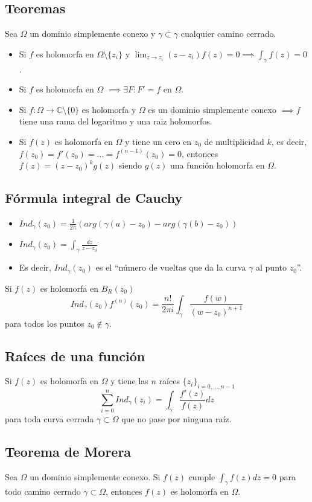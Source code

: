 \documentclass[paper=a4, fontsize=11pt]{scrartcl}
\numberwithin{equation}{section}
\numberwithin{figure}{section}
\numberwithin{table}{section}
\begin{document}
\subsection{Teoremas}
Sea $\Omega$ un dominio simplemente conexo y $\gamma\subset\gamma$ cualquier camino cerrado.
\begin{itemize}
\item Si $f$ es holomorfa en $\Omega\setminus\{z_i\}$ y $\lim_{z\to z_i} (z-z_i)f(z) = 0 \implies \int_{\gamma}f(z) = 0$.
\item Si $f$ es holomorfa en $\Omega$ $\implies \exists F: F'=f$ en $\Omega$.
\item Si $f:\Omega\to\mathbb{C}\setminus\{0\}$ es holomorfa y $\Omega$ es un dominio simplemente conexo $\implies f$ tiene una rama del logaritmo y una raiz holomorfos.
\item Si $f(z)$ es holomorfa en $\Omega$ y tiene un cero en $z_0$ de multiplicidad $k$, es decir, $f(z_0) = f'(z_0) = \hdots = f^{(n-1)}(z_0) = 0$, entonces $f(z) = (z-z_0)^kg(z)$ siendo $g(z)$ una función holomorfa en $\Omega$.
\end{itemize}

\subsection{Fórmula integral de Cauchy}
\begin{itemize}
\item $Ind_\gamma (z_0) = \frac{1}{2\pi}\left(arg(\gamma(a)-z_0)-arg(\gamma(b)-z_0)\right)$
\item $Ind_\gamma (z_0) = \int_\gamma \frac{dz}{z-z_0}$
\item Es decir, $Ind_\gamma (z_0)$ es el ``número de vueltas que da la curva $\gamma$ al punto $z_0$''.
\end{itemize}
Si $f(z)$ es holomorfa en $B_R(z_0)$
$$\boxed{Ind_\gamma(z_0) f^{(n)}(z_0) = \frac{n!}{2\pi i}\int_\gamma \frac{f(w)}{(w-z_0)^{n+1}}}$$
para todos los puntos $z_0\notin \gamma$.

\subsection{Raíces de una función}
Si $f(z)$ es holomorfa en $\Omega$ y tiene las $n$ raíces $\{{z_i}\}_{i=0,\hdots,n-1}$
$$\sum_{i=0}^n Ind_\gamma(z_i) = \int_\gamma \frac{f'(z)}{f(z)}dz$$
para toda curva cerrada $\gamma\subset\Omega$ que no pase por ninguna raíz.

\subsection{Teorema de Morera}
Sea $\Omega$ un dominio simplemente conexo. Si $f(z)$ cumple $\int_{\gamma} f(z)dz = 0$ para todo camino cerrado $\gamma\subset\Omega$, entonces $f(z)$ es holomorfa en $\Omega$. 
\end{document}
